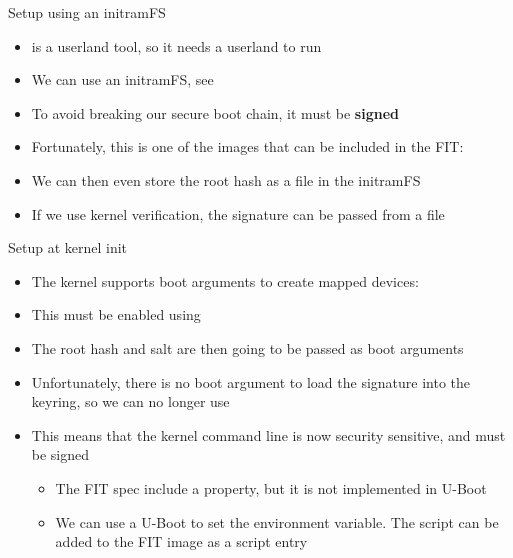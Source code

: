 \begin{frame}{Setup using an initramFS}
  \begin{itemize}
    \item {} is a userland tool, so it needs a userland to run
    \item We can use an initramFS, see 
    \item To avoid breaking our secure boot chain, it must be \textbf{signed}
    \item Fortunately, this is one of the images that can be included in the FIT: 
    \item We can then even store the root hash as a file in the initramFS
    \item If we use kernel verification, the signature can be passed from a file
  \end{itemize}
\end{frame}

\begin{frame}{Setup at kernel init}
  \begin{itemize}
    \item The kernel supports boot arguments to create mapped devices: 
    \item This must be enabled using 
    \item The root hash and salt are then going to be passed as boot arguments
    \item Unfortunately, there is no boot argument to load the signature into the keyring,
          so we can no longer use 
    \item This means that the kernel command line is now security sensitive, and must be signed
    \begin{itemize}
      \item The FIT spec include a  property, but it is not implemented in U-Boot
      \item We can use a U-Boot  to set the  environment variable.
            The script can be added to the FIT image as a script entry
    \end{itemize}
  \end{itemize}
\end{frame}

